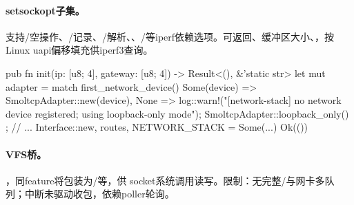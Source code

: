 \paragraph{setsockopt子集。}支持/空操作、/记录、/解析、、/等iperf依赖选项。可返回、缓冲区大小、，按Linux uapi偏移填充供iperf3查询。

\begin{rustcode}
pub fn init(ip: [u8; 4], gateway: [u8; 4]) -> Result<(), &'static str> {
    let mut adapter = match first_network_device() {
        Some(device) => SmoltcpAdapter::new(device),
        None => {
            log::warn!("[network-stack] no network device registered; using loopback-only mode");
            SmoltcpAdapter::loopback_only()
        }
    };
    // ... Interface::new, routes, NETWORK_STACK = Some(...)
    Ok(())
}
\end{rustcode}

\paragraph{VFS桥。}，同feature将包装为/等，供 socket系统调用读写。限制：无完整/与网卡多队列；中断未驱动收包，依赖poller轮询。
